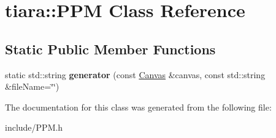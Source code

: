 \hypertarget{classtiara_1_1PPM}{}\section{tiara\+::P\+PM Class Reference}
\label{classtiara_1_1PPM}
\subsection*{Static Public Member Functions}
\begin{DoxyCompactItemize}
\item 
\mbox{\label{classtiara_1_1PPM_a760af22a91eeeb8c169505472c074d3f}} 
static std\+::string {\bfseries generator} (const \mbox{\hyperlink{classtiara_1_1Canvas}{Canvas}} \&canvas, const std\+::string \&file\+Name=\char`\"{}\char`\"{})
\end{DoxyCompactItemize}


The documentation for this class was generated from the following file\+:\begin{DoxyCompactItemize}
\item 
include/P\+P\+M.\+h\end{DoxyCompactItemize}
